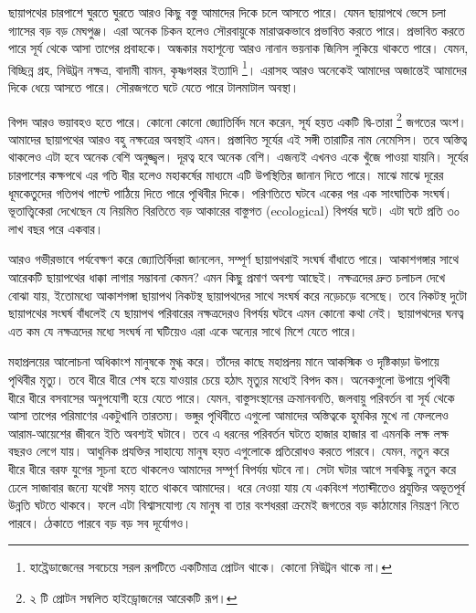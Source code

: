 \documentclass[
]{book}
\begin{document}
ছায়াপথের চারপাশে ঘুরতে ঘুরতে আরও কিছু বস্তু আমাদের দিকে চলে আসতে পারে। যেমন ছায়াপথে ভেসে চলা গ্যাসের বড় বড় মেঘপুঞ্জ। এরা অনেক চিকন হলেও সৌরবায়ুকে মারাত্মকভাবে প্রভাবিত করতে পারে। প্রভাবিত করতে পারে সূর্য থেকে আসা তাপের প্রবাহকে। অন্ধকার মহাশূন্যে আরও নানান ভয়নাক জিনিস লুকিয়ে থাকতে পারে। যেমন, বিচ্ছিন্ন গ্রহ, নিউট্রন নক্ষত্র, বাদামী বামন, কৃষ্ণগহ্বর ইত্যাদি \footnote{হাই্রেডাজেনের সবচেয়ে সরল রূপটিতে একটিমাত্র প্রোটন থাকে। কোনো নিউট্রন থাকে না।}। এরাসহ আরও অনেকেই আমাদের অজান্তেই আমাদের দিকে ধেয়ে আসতে পারে। সৌরজগতে ঘটে যেতে পারে টালমাটাল অবস্থা।

বিপদ আরও ভয়াবহও হতে পারে। কোনো কোনো জ্যোতির্বিদ মনে করেন, সূর্য হয়ত একটি দ্বি-তারা \footnote{২ টি প্রোটন সম্বলিত হাইড্রোজনের আরেকটি রূপ।} জগতের অংশ। আমাদের ছায়াপথের আরও বহু নক্ষত্রের অবস্থাই এমন। প্রস্তাবিত সূর্যের এই সঙ্গী তারাটির নাম নেমেসিস। তবে অস্তিত্ব থাকলেও এটা হবে অনেক বেশি অনুজ্জ্বল। দূরত্ব হবে অনেক বেশি। এজন্যই এখনও একে খুঁজে পাওয়া যায়নি। সূর্যের চারপাশের কক্ষপথে এর গতি ধীর হলেও মহাকর্ষের মাধ্যমে এটি উপস্থিতির জানান দিতে পারে। মাঝে মাঝে দূরের ধূমকেতুদের গতিপথ পাল্টে পাঠিয়ে দিতে পারে পৃথিবীর দিকে। পরিণতিতে ঘটবে একের পর এক সাংঘাতিক সংঘর্ষ। ভূতাত্ত্বিকেরা দেখেছেন যে নিয়মিত বিরতিতে বড় আকারের বাস্তুগত (ecological) বিপর্যর ঘটে। এটা ঘটে প্রতি ৩০ লাখ বছর পরে একবার।

আরও গভীরভাবে পর্যবেক্ষণ করে জ্যোতির্বিদরা জানলেন, সম্পূর্ণ ছায়াপথরাই সংঘর্ষ বাঁধাতে পারে। আকাশগঙ্গার সাথে আরেকটি ছায়াপথের ধাক্কা লাগার সম্ভাবনা কেমন? এমন কিছু প্রমাণ অবশ্য আছেই। নক্ষত্রদের দ্রুত চলাচল দেখে বোঝা যায়, ইতোমধ্যে আকাশগঙ্গা ছায়াপথ নিকটস্থ ছায়াপথদের সাথে সংঘর্ষ করে নড়েচড়ে বসেছে। তবে নিকটস্থ দুটো ছায়াপথের সংঘর্ষ বাঁধলেই যে ছায়াপথ পরিবারের নক্ষত্রদেরও বিপর্যয় ঘটবে এমন কোনো কথা নেই। ছায়াপথদের ঘনত্ব এত কম যে নক্ষত্রদের মধ্যে সংঘর্ষ না ঘটিয়েও এরা একে অন্যের সাথে মিশে যেতে পারে।

মহাপ্রলয়ের আলোচনা অধিকাংশ মানুষকে মুগ্ধ করে। তাঁদের কাছে মহাপ্রলয় মানে আকস্মিক ও দৃষ্টিকাড়া উপায়ে পৃথিবীর মৃত্যু। তবে ধীরে ধীরে শেষ হয়ে যাওয়ার চেয়ে হঠাৎ মৃত্যুর মধ্যেই বিপদ কম। অনেকগুলো উপায়ে পৃথিবী ধীরে ধীরে বসবাসের অনুপযোগী হয়ে যেতে পারে। যেমন, বাস্তুসংস্থানের ক্রমানবনতি, জলবায়ু পরিবর্তন বা সূর্য থেকে আসা তাপের পরিমাণের একটুখানি তারতম্য। ভঙ্গুর পৃথিবীতে এগুলো আমাদের অস্তিত্বকে হুমকির মুখে না ফেললেও আরাম-আয়েশের জীবনে ইতি অবশ্যই ঘটাবে। তবে এ ধরনের পরিবর্তন ঘটতে হাজার হাজার বা এমনকি লক্ষ লক্ষ বছরও লেগে যায়। আধুনিক প্রযক্তির সাহায্যে মানুষ হয়ত এগুলোকে প্রতিরোধও করতে পারবে। যেমন, নতুন করে ধীরে ধীরে বরফ যুগের সূচনা হতে থাকলেও আমাদের সম্পূর্ণ বিপর্যয় ঘটবে না। সেটা ঘটার আগে সবকিছু নতুন করে ঢেলে সাজাবার জন্যে যথেষ্ট সময় হাতে থাকবে আমাদের। ধরে নেওয়া যায় যে একবিংশ শতাব্দীতেও প্রযুক্তির অভূতপূর্ব উন্নতি ঘটতে থাকবে। ফলে এটা বিশ্বাসযোগ্য যে মানুষ বা তার বংশধররা ক্রমেই জগতের বড় কাঠামোর নিয়ন্ত্রণ নিতে পারবে। ঠেকাতে পারবে বড় বড় সব দূর্যোগও।
\end{document}
